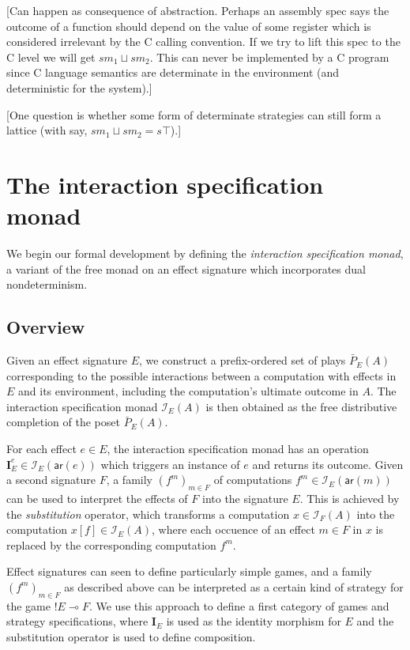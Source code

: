 \documentclass[format=sigplan,authordraft]{acmart}
\newcommand{\kw}[1]{\ensuremath{ \mathsf{#1} }}
\begin{document}
[Can happen as consequence of abstraction.
Perhaps an assembly spec says
the outcome of a function should depend on the value of some
register which is considered irrelevant by the C calling convention.
If we try to lift this spec to the C level
we will get $s m_1 \sqcup s m_2$.
This can never be implemented by a C program
since C language semantics are determinate in the environment
(and deterministic for the system).]

[One question is whether
some form of determinate strategies
can still form a lattice
(with say, $sm_1 \sqcup sm_2 = s \top$).]




\section{The interaction specification monad} \label{sec:intspec} %

We begin our formal development
by defining the \emph{interaction specification monad},
a variant of the free monad on an effect signature which
incorporates dual nondeterminism.

\subsection{Overview} %

Given an effect signature $E$,
we construct a prefix-ordered set of plays $\bar{P}_E(A)$
corresponding to the possible interactions between
a computation with effects in $E$
and its environment,
including the computation's ultimate outcome in $A$.
The interaction specification monad $\mathcal{I}_E(A)$ is then obtained
as the free distributive completion of the poset $\bar{P}_E(A)$.

For each effect $e \in E$,
the interaction specification monad
has an operation
$\mathbf{I}_E^e \in \mathcal{I}_E(\kw{ar}(e))$
which triggers an instance of $e$ and returns its outcome.
Given a second signature $F$,
a family $(f^m)_{m \in F}$ of computations
$f^m \in \mathcal{I}_E(\kw{ar}(m))$
can be used to interpret the effects of $F$
into the signature $E$.
This is achieved by the \emph{substitution} operator,
which transforms a computation $x \in \mathcal{I}_F(A)$
into the computation $x[f] \in \mathcal{I}_E(A)$,
where each occuence of an effect $m \in F$ in $x$
is replaced by the corresponding computation $f^m$.

Effect signatures can seen to define
particularly simple games,
and a family $(f^m)_{m \in F}$ as described above
can be interpreted as
a certain kind of strategy for the game ${!E} \multimap F$.
We use this approach to define
a first category of games and strategy specifications,
where $\mathbf{I}_E$ is used as
the identity morphism for $E$ and
the substitution operator is used to define composition.
\end{document}
